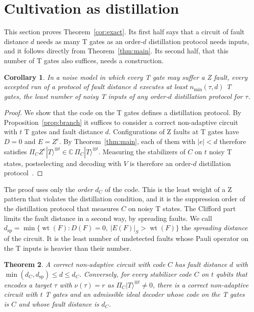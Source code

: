 \documentclass[aps,prl,reprint,twocolumn,amsmath,amssymb,floatfix,nofootinbib,superscriptaddress]{revtex4-2}
\newtheorem{theorem}{Theorem}
\newtheorem{corollary}[theorem]{Corollary}
\theoremstyle{definition}
\theoremstyle{remark}
\newcommand{\wt}{\operatorname{wt}}
\begin{document}
\section{Cultivation as distillation}\label{sm:distill}
This section proves Theorem~\ref{cor:exact}. Its first half says that a circuit of fault distance $d$ needs as many T gates as an order-$d$ distillation protocol needs inputs, and it follows directly from Theorem~\ref{thm:main}. Its second half, that this number of T gates also suffices, needs a construction.
\begin{corollary}\label{cor:tcount}
In a noise model in which every T gate may suffer a Z fault, every accepted run of a protocol of fault distance $d$ executes at least $n_{\min}(\tau,d)$ T gates, the least number of noisy T inputs of any order-$d$ distillation protocol for $\tau$.
\end{corollary}
\begin{proof}
We show that the code on the T gates defines a distillation protocol. By Proposition~\ref{prop:branch} it suffices to consider a correct non-adaptive circuit with $t$ T gates and fault distance $d$. Configurations of Z faults at T gates have $D=0$ and $E=Z^e$. By Theorem~\ref{thm:main}, each of them with $|e|<d$ therefore satisfies $\Pi_CZ^e|T\rangle^{\otimes t}\in\mathbb C\,\Pi_C|T\rangle^{\otimes t}$. Measuring the stabilizers of $C$ on $t$ noisy T states, postselecting and decoding with $V$ is therefore an order-$d$ distillation protocol~\cite{distillationpaper}.
\end{proof}
The proof uses only the \emph{order} $d_C$ of the code. This is the least weight of a Z pattern that violates the distillation condition, and it is the suppression order of the distillation protocol that measures $C$ on noisy T states. The Clifford part limits the fault distance in a second way, by spreading faults. We call $d_{\mathrm{sp}}=\min\{\wt(F):D(F)=0,\ |E(F)|_S>\wt(F)\}$ the \emph{spreading distance} of the circuit. It is the least number of undetected faults whose Pauli operator on the T inputs is heavier than their number.
\begin{theorem}\label{thm:attain}
A correct non-adaptive circuit with code $C$ has fault distance $d$ with $\min(d_C,d_{\mathrm{sp}})\leq d\leq d_C$. Conversely, for every stabilizer code $C$ on $t$ qubits that encodes a target $\tau$ with $\nu(\tau)=r$ as $\Pi_C|T\rangle^{\otimes t}\neq0$, there is a correct non-adaptive circuit with $t$ T gates and an admissible ideal decoder whose code on the T gates is $C$ and whose fault distance is $d_C$.
\end{theorem}
\end{document}

